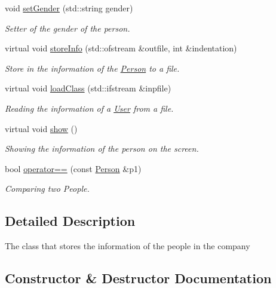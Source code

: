 \begin{DoxyCompactItemize}
void \mbox{\hyperlink{class_person_a7625b600d2c9c0b9c9fc060a6906dac6}{set\+Gender}} (std\+::string gender)
\begin{DoxyCompactList}\small\item\em Setter of the gender of the person. \end{DoxyCompactList}\item 
virtual void \mbox{\hyperlink{class_person_a80f87df3f644706c2ad8fc8b800fdd95}{store\+Info}} (std\+::ofstream \&outfile, int \&indentation)
\begin{DoxyCompactList}\small\item\em Store in the information of the \mbox{\hyperlink{class_person}{Person}} to a file. \end{DoxyCompactList}\item 
virtual void \mbox{\hyperlink{class_person_af07a032df8d56dddade4dc43960b536b}{load\+Class}} (std\+::ifstream \&inpfile)
\begin{DoxyCompactList}\small\item\em Reading the information of a \mbox{\hyperlink{class_user}{User}} from a file. \end{DoxyCompactList}\item 
virtual void \mbox{\hyperlink{class_person_a2f1231629a6e7e8c83ada57628e80a89}{show}} ()
\begin{DoxyCompactList}\small\item\em Showing the information of the person on the screen. \end{DoxyCompactList}\item 
bool \mbox{\hyperlink{class_person_aa2fe338cbcf08ee5981dce811fd3a50a}{operator==}} (const \mbox{\hyperlink{class_person}{Person}} \&p1)
\begin{DoxyCompactList}\small\item\em Comparing two People. \end{DoxyCompactList}\end{DoxyCompactItemize}


\subsection{Detailed Description}
The class that stores the information of the people in the company 

\subsection{Constructor \& Destructor Documentation}
\mbox{\label{class_person_a0397c6f89fafc12e738923f612bc41a3}} 
